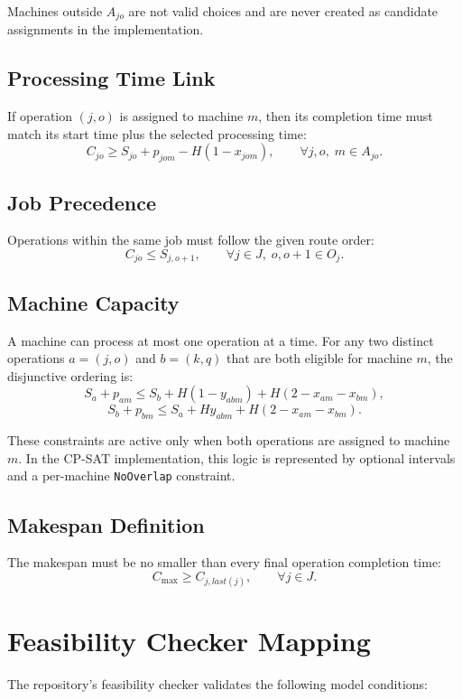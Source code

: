 ﻿\documentclass[11pt]{article}
\begin{document}
Machines outside $A_{jo}$ are not valid choices and are never created as
candidate assignments in the implementation.

\subsection{Processing Time Link}

If operation $(j,o)$ is assigned to machine $m$, then its completion time must
match its start time plus the selected processing time:
\[
C_{jo} \ge S_{jo} + p_{jom} - H(1 - x_{jom}),
\qquad \forall j,o,\; m \in A_{jo}.
\]

\subsection{Job Precedence}

Operations within the same job must follow the given route order:
\[
C_{jo} \le S_{j,o+1},
\qquad \forall j \in J,\; o,o+1 \in O_j.
\]

\subsection{Machine Capacity}

A machine can process at most one operation at a time. For any two distinct
operations $a=(j,o)$ and $b=(k,q)$ that are both eligible for machine $m$,
the disjunctive ordering is:
\[
S_a + p_{am} \le S_b + H(1 - y_{abm}) + H(2 - x_{am} - x_{bm}),
\]
\[
S_b + p_{bm} \le S_a + Hy_{abm} + H(2 - x_{am} - x_{bm}).
\]

These constraints are active only when both operations are assigned to machine
$m$. In the CP-SAT implementation, this logic is represented by optional
intervals and a per-machine \texttt{NoOverlap} constraint.

\subsection{Makespan Definition}

The makespan must be no smaller than every final operation completion time:
\[
C_{\max} \ge C_{j,last(j)}, \qquad \forall j \in J.
\]

\section{Feasibility Checker Mapping}

The repository's feasibility checker validates the following model conditions:
\end{document}
